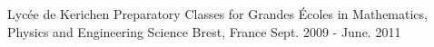 \begin{cventries}
  \cventry
  {Lycée de Kerichen} %
  {Preparatory Classes for Grandes Écoles in Mathematics, Physics and Engineering Science} %
  {Brest, France} %
  {Sept. 2009 - June. 2011} %
  {}
\end{cventries}
